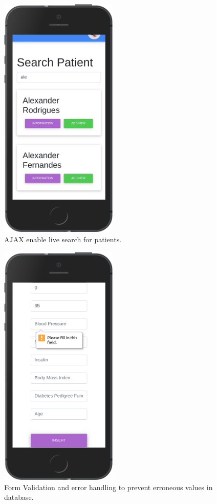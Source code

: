 \documentclass[12pt]{article}
\begin{document}
\begin{figure}[ht]
\centering
\includegraphics[width=0.5\textwidth]{7se.png}
\caption{\label{fig:56} AJAX enable live search for patients.}
\end{figure}
\begin{figure}[ht]
\centering
\includegraphics[width=0.5\textwidth]{8se.png}
\caption{\label{fig:57} Form Validation and error handling to prevent erroneous values in database.}
\end{figure}
\end{document}
